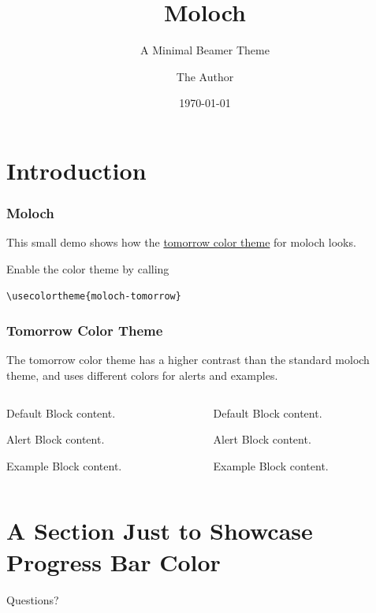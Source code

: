 \documentclass[10pt]{beamer}
\title{Moloch}
\subtitle{A Minimal Beamer Theme}
\date{\today}
\author{The Author}
\institute{Some Institution, Some University}
\begin{document}
\maketitle

\section{Introduction}

\begin{frame}[fragile]
\frametitle{Moloch}
  This small demo shows how the
  \href{https://github.com/chriskempson/tomorrow-theme}{tomorrow color theme}
  for moloch looks.\bigskip

  Enable the color theme by calling
  \begin{verbatim}
\usecolortheme{moloch-tomorrow}\end{verbatim}
\end{frame}

\begin{frame}[fragile]
\frametitle{Tomorrow Color Theme}
  The tomorrow color theme has a higher contrast than the standard moloch theme, and uses
  different colors for alerts and examples.

  \begin{columns}[T]
    \begin{column}{0.45\textwidth}
      \begin{block}{Default}
        Block content.
      \end{block}

      \begin{alertblock}{Alert}
        Block content.
      \end{alertblock}

      \begin{exampleblock}{Example}
        Block content.
      \end{exampleblock}
    \end{column}
    \begin{column}{0.45\textwidth}
      {

        \begin{block}{Default}
          Block content.
        \end{block}

        \begin{alertblock}{Alert}
          Block content.
        \end{alertblock}

        \begin{exampleblock}{Example}
          Block content.
        \end{exampleblock}
      }
    \end{column}
  \end{columns}
\end{frame}

\section{A Section Just to Showcase Progress Bar Color}

\begin{frame}[standout]
  Questions?
\end{frame}
\end{document}
